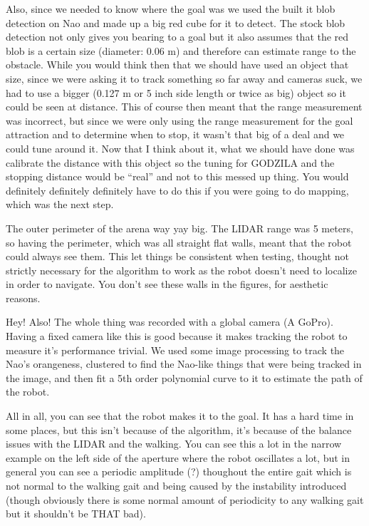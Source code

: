 Also, since we needed to know where the goal was we used the built it blob
detection on Nao and made up a big red cube for it to detect.
The stock blob detection not only gives you bearing to a goal but it also assumes that the
red blob is a certain size (diameter: 0.06 m) and therefore can estimate range to the obstacle.
While you would think then that we should have used an object that size,
since we were asking it to track something so far away and cameras suck, we had to use a bigger (0.127 m or 5 inch
side length or twice as big)
object so it could be seen at distance.
This of course then meant that the range measurement was incorrect, but since we were
only using the range measurement for the goal attraction and to determine when to stop,
it wasn't that big of a deal and we could tune around it.
Now that I think about it, what we should have done was calibrate the distance with this
object so the tuning for GODZILA and the stopping distance would be ``real'' and not to
this messed up thing.
You would definitely definitely definitely have to do this if you were going to do mapping,
which was the next step.

The outer perimeter of the arena way yay big. The LIDAR range was 5 meters, so having the
perimeter, which was all straight flat walls, meant that the robot could always see them.
This let things be consistent when testing, thought not strictly necessary for the algorithm to
work as the robot doesn't need to localize in order to navigate.
You don't see these walls in the figures, for aesthetic reasons.

Hey! Also! The whole thing was recorded with a global camera (A GoPro).
Having a fixed camera like this is good because it makes tracking the robot
to measure it's performance trivial.
We used some image processing to track the Nao's orangeness, clustered to
find the Nao-like things that were being tracked in the image,
and then fit a 5th order polynomial curve to it to estimate the path of the
robot.

All in all, you can see that the robot makes it to the goal.
It has a hard time in some places, but this isn't because of the algorithm,
it's because of the balance issues with the LIDAR and the walking.
You can see this a lot in the narrow example on the left side of the aperture where the
robot oscillates a lot, but in general you can see a periodic amplitude (?) thoughout 
the entire gait which is not normal to the walking gait and being caused by the
instability introduced (though obviously there is some normal amount of periodicity
to any walking gait but it shouldn't be THAT bad).

